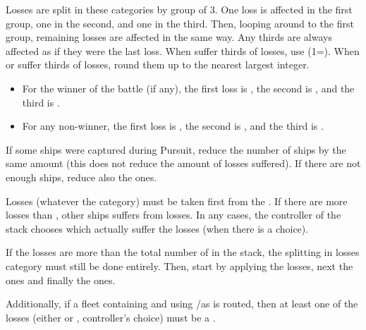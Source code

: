 Losses are split in these categories by group of 3. One loss is affected in
the first group, one in the second, and one in the third. Then, looping around
to the first group, remaining losses are affected in the same way. Any thirds
are always affected as if they were the last loss. When \NWD suffer thirds of
losses, use \NDE (1\NDE=\texttu\NWD). When \NGD or \NTD suffer thirds of
losses, round them up to the nearest largest integer.

\begin{itemize}
\item For the winner of the battle (if any), the first loss is
  , the second is , and the third is
  .
\item For any non-winner, the first loss is , the second is
  , and the third is .
\end{itemize}

If some ships were captured during Pursuit, reduce the number of
 ships by the same amount (this does not reduce the amount of
losses suffered). If there are not enough  ships, reduce also
the  ones.

Losses (whatever the category) must be taken first from the . If there are more losses than , other ships
suffers from losses. In any cases, the controller of the stack chooses which
\ND actually suffer the losses (when there is a choice).

If the losses are more than the total number of \ND in the stack, the
splitting in losses category must still be done entirely. Then, start by
applying the  losses, next the  ones and
finally the  ones.

Additionally, if a fleet containing \VGD and using \NGD/\VGD as  is routed, then at least one of the losses (either
 or , controller's choice) must be a \VGD.

